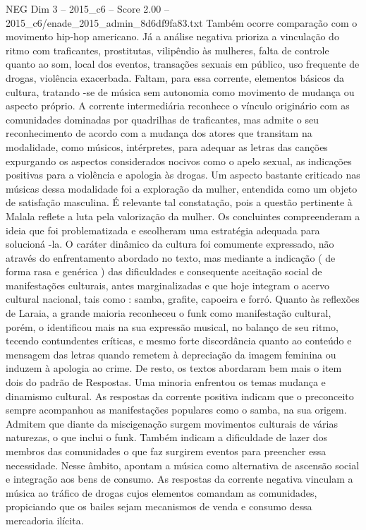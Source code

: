 \begin{textsample}{NEG Dim 3 – 2015\_c6 – Score 2.00 – 2015\_c6/enade\_2015\_admin\_8d6df9fa83.txt}
Também ocorre comparação com o movimento hip-hop americano.
Já a análise negativa prioriza a vinculação do ritmo com traficantes, prostitutas, vilipêndio às mulheres, falta de controle quanto ao som, local dos eventos, transações sexuais em público, uso frequente de drogas, violência exacerbada.
Faltam, para essa corrente, elementos básicos da cultura, tratando -se de música sem autonomia como movimento de mudança ou aspecto próprio.
A corrente intermediária reconhece o vínculo originário com as comunidades dominadas por quadrilhas de traficantes, mas admite o seu reconhecimento de acordo com a mudança dos atores que transitam na modalidade, como músicos, intérpretes, para adequar as letras das canções expurgando os aspectos considerados nocivos como o apelo sexual, as indicações positivas para a violência e apologia às drogas.
Um aspecto bastante criticado nas músicas dessa modalidade foi a exploração da mulher, entendida como um objeto de satisfação masculina.
É relevante tal constatação, pois a questão pertinente à Malala reflete a luta pela valorização da mulher.
Os concluintes compreenderam a ideia que foi problematizada e escolheram uma estratégia adequada para solucioná -la.
O caráter dinâmico da cultura foi comumente expressado, não através do enfrentamento abordado no texto, mas mediante a indicação ( de forma rasa e genérica ) das dificuldades e consequente aceitação social de manifestações culturais, antes marginalizadas e que hoje integram o acervo cultural nacional, tais como : samba, grafite, capoeira e forró.
Quanto às reflexões de Laraia, a grande maioria reconheceu o funk como manifestação cultural, porém, o identificou mais na sua expressão musical, no balanço de seu ritmo, tecendo contundentes críticas, e mesmo forte discordância quanto ao conteúdo e mensagem das letras quando remetem à depreciação da imagem feminina ou induzem à apologia ao crime.
De resto, os textos abordaram bem mais o item dois do padrão de Respostas.
Uma minoria enfrentou os temas mudança e dinamismo cultural.
As respostas da corrente positiva indicam que o preconceito sempre acompanhou as manifestações populares como o samba, na sua origem.
Admitem que diante da miscigenação surgem movimentos culturais de várias naturezas, o que inclui o funk.
Também indicam a dificuldade de lazer dos membros das comunidades o que faz surgirem eventos para preencher essa necessidade.
Nesse âmbito, apontam a música como alternativa de ascensão social e integração aos bens de consumo.
As respostas da corrente negativa vinculam a música ao tráfico de drogas cujos elementos comandam as comunidades, propiciando que os bailes sejam mecanismos de venda e consumo dessa mercadoria ilícita.

\end{textsample}
